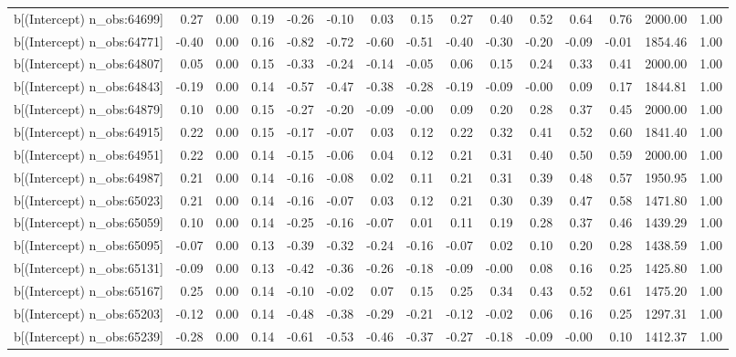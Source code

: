 \begin{table}[ht]
\begin{tabular}{rrrrrrrrrrrrrrr}
  b[(Intercept) n\_obs:64699] & 0.27 & 0.00 & 0.19 & -0.26 & -0.10 & 0.03 & 0.15 & 0.27 & 0.40 & 0.52 & 0.64 & 0.76 & 2000.00 & 1.00 \\ 
  b[(Intercept) n\_obs:64771] & -0.40 & 0.00 & 0.16 & -0.82 & -0.72 & -0.60 & -0.51 & -0.40 & -0.30 & -0.20 & -0.09 & -0.01 & 1854.46 & 1.00 \\ 
  b[(Intercept) n\_obs:64807] & 0.05 & 0.00 & 0.15 & -0.33 & -0.24 & -0.14 & -0.05 & 0.06 & 0.15 & 0.24 & 0.33 & 0.41 & 2000.00 & 1.00 \\ 
  b[(Intercept) n\_obs:64843] & -0.19 & 0.00 & 0.14 & -0.57 & -0.47 & -0.38 & -0.28 & -0.19 & -0.09 & -0.00 & 0.09 & 0.17 & 1844.81 & 1.00 \\ 
  b[(Intercept) n\_obs:64879] & 0.10 & 0.00 & 0.15 & -0.27 & -0.20 & -0.09 & -0.00 & 0.09 & 0.20 & 0.28 & 0.37 & 0.45 & 2000.00 & 1.00 \\ 
  b[(Intercept) n\_obs:64915] & 0.22 & 0.00 & 0.15 & -0.17 & -0.07 & 0.03 & 0.12 & 0.22 & 0.32 & 0.41 & 0.52 & 0.60 & 1841.40 & 1.00 \\ 
  b[(Intercept) n\_obs:64951] & 0.22 & 0.00 & 0.14 & -0.15 & -0.06 & 0.04 & 0.12 & 0.21 & 0.31 & 0.40 & 0.50 & 0.59 & 2000.00 & 1.00 \\ 
  b[(Intercept) n\_obs:64987] & 0.21 & 0.00 & 0.14 & -0.16 & -0.08 & 0.02 & 0.11 & 0.21 & 0.31 & 0.39 & 0.48 & 0.57 & 1950.95 & 1.00 \\ 
  b[(Intercept) n\_obs:65023] & 0.21 & 0.00 & 0.14 & -0.16 & -0.07 & 0.03 & 0.12 & 0.21 & 0.30 & 0.39 & 0.47 & 0.58 & 1471.80 & 1.00 \\ 
  b[(Intercept) n\_obs:65059] & 0.10 & 0.00 & 0.14 & -0.25 & -0.16 & -0.07 & 0.01 & 0.11 & 0.19 & 0.28 & 0.37 & 0.46 & 1439.29 & 1.00 \\ 
  b[(Intercept) n\_obs:65095] & -0.07 & 0.00 & 0.13 & -0.39 & -0.32 & -0.24 & -0.16 & -0.07 & 0.02 & 0.10 & 0.20 & 0.28 & 1438.59 & 1.00 \\ 
  b[(Intercept) n\_obs:65131] & -0.09 & 0.00 & 0.13 & -0.42 & -0.36 & -0.26 & -0.18 & -0.09 & -0.00 & 0.08 & 0.16 & 0.25 & 1425.80 & 1.00 \\ 
  b[(Intercept) n\_obs:65167] & 0.25 & 0.00 & 0.14 & -0.10 & -0.02 & 0.07 & 0.15 & 0.25 & 0.34 & 0.43 & 0.52 & 0.61 & 1475.20 & 1.00 \\ 
  b[(Intercept) n\_obs:65203] & -0.12 & 0.00 & 0.14 & -0.48 & -0.38 & -0.29 & -0.21 & -0.12 & -0.02 & 0.06 & 0.16 & 0.25 & 1297.31 & 1.00 \\ 
  b[(Intercept) n\_obs:65239] & -0.28 & 0.00 & 0.14 & -0.61 & -0.53 & -0.46 & -0.37 & -0.27 & -0.18 & -0.09 & -0.00 & 0.10 & 1412.37 & 1.00 \\ 

\end{tabular}
\end{table}
